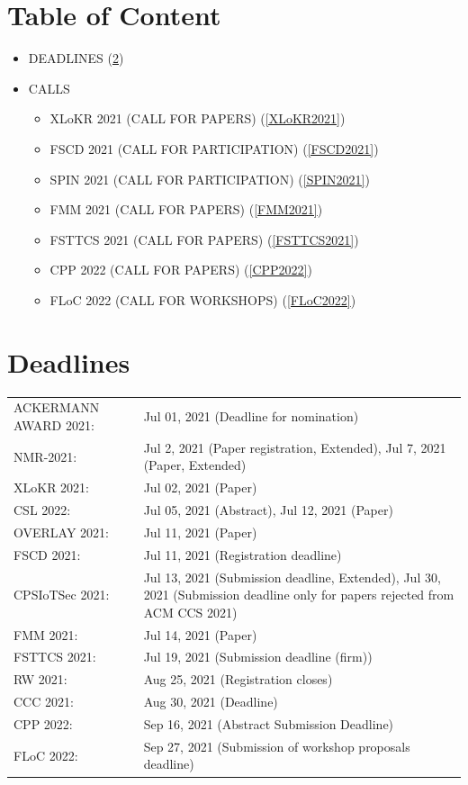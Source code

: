 \documentclass[prodmode,acmtecs]{acmsmall} %
\begin{document}
\section{Table of Content}\begin{itemize}\item DEADLINES (\cref{deadlines}) 
 
\item CALLS 
 
\begin{itemize}\item XLoKR 2021 (CALL FOR PAPERS) (\cref{XLoKR2021})
\item FSCD 2021 (CALL FOR PARTICIPATION) (\cref{FSCD2021})
\item SPIN 2021 (CALL FOR PARTICIPATION) (\cref{SPIN2021})
\item FMM 2021 (CALL FOR PAPERS) (\cref{FMM2021})
\item FSTTCS 2021 (CALL FOR PAPERS) (\cref{FSTTCS2021})
\item CPP 2022 (CALL FOR PAPERS) (\cref{CPP2022})
\item FLoC 2022 (CALL FOR WORKSHOPS) (\cref{FLoC2022})
\end{itemize} 
\end{itemize}\section{Deadlines}\label{deadlines}\begin{tabulary}{\linewidth}{LL}ACKERMANN AWARD 2021:  & Jul 01, 2021 (Deadline for nomination) \\
NMR-2021:  & Jul 2, 2021 (Paper registration, Extended), Jul 7, 2021 (Paper, Extended) \\
XLoKR 2021:  & Jul 02, 2021 (Paper) \\
CSL 2022:  & Jul 05, 2021 (Abstract), Jul 12, 2021 (Paper) \\
OVERLAY 2021:  & Jul 11, 2021 (Paper) \\
FSCD 2021:  & Jul 11, 2021 (Registration deadline) \\
CPSIoTSec 2021:  & Jul 13, 2021 (Submission deadline, Extended), Jul 30, 2021 (Submission deadline only for papers rejected from ACM CCS 2021) \\
FMM 2021:  & Jul 14, 2021 (Paper) \\
FSTTCS 2021:  & Jul 19, 2021 (Submission deadline (firm)) \\
RW 2021:  & Aug 25, 2021 (Registration closes) \\
CCC 2021:  & Aug 30, 2021 (Deadline) \\
CPP 2022:  & Sep 16, 2021 (Abstract Submission Deadline) \\
FLoC 2022:  & Sep 27, 2021 (Submission of workshop proposals deadline) \\
\end{tabulary}
\end{document}
